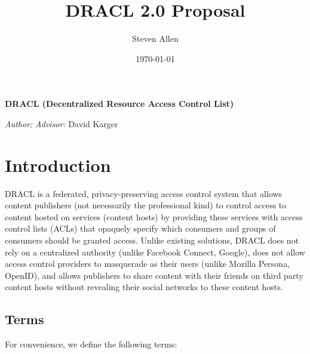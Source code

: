 \documentclass[pdftex,12pt,a4papaer]{report}
\title{DRACL 2.0 Proposal}
\author{Steven Allen}
\date{\today}
\begin{document}
\thispagestyle{plain}

\begin{center}
    \vspace*{\fill}
    {%
        \onehalfspacing{} \bfseries \Large
        DRACL (Decentralized Resource Access Control List) \\
    }

    \vspace{\fill}
    {\large
    \begin{minipage}{0.9\textwidth}
        \emph{Author:} \theauthor{} \hfill \emph{Advisor:} David Karger
        \\
        \begin{center}
              \thedate{}
        \end{center}
    \end{minipage}
    }
    \vspace*{\fill}
\end{center}

\tableofcontents

\newpage

\chapter{Introduction} 

DRACL is a federated, privacy-preserving access control system that allows
content publishers (not necessarily the professional kind) to control access to
content hosted on services (content hosts) by providing these services with
access control lists (ACLs) that opaquely specify which consumers and groups of
consumers should be granted access. Unlike existing solutions, DRACL does not
rely on a centralized authority (unlike Facebook Connect, Google), does not
allow access control providers to masquerade as their users (unlike Mozilla
Persona, OpenID), and allows publishers to share content with their friends on
third party content hosts without revealing their social networks to these
content hosts.

\section{Terms}

For convenience, we define the following terms:
\end{document}
